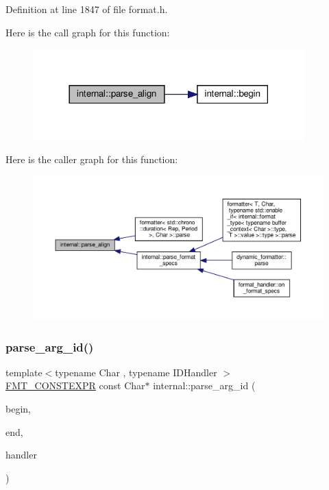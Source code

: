 Definition at line 1847 of file format.\+h.

Here is the call graph for this function\+:
\nopagebreak
\begin{figure}[H]
\begin{center}
\leavevmode
\includegraphics[width=297pt]{namespaceinternal_a07a6cecb40169f9f2eb091d0e83cc52f_cgraph}
\end{center}
\end{figure}
Here is the caller graph for this function\+:
\nopagebreak
\begin{figure}[H]
\begin{center}
\leavevmode
\includegraphics[width=350pt]{namespaceinternal_a07a6cecb40169f9f2eb091d0e83cc52f_icgraph}
\end{center}
\end{figure}
\mbox{\label{namespaceinternal_a0f424657f3b1900377b8597f5516432e}} 
\subsubsection{\texorpdfstring{parse\+\_\+arg\+\_\+id()}{parse\_arg\_id()}}
{\footnotesize\ttfamily template$<$typename Char , typename I\+D\+Handler $>$ \\
\hyperlink{core_8h_a69201cb276383873487bf68b4ef8b4cd}{F\+M\+T\+\_\+\+C\+O\+N\+S\+T\+E\+X\+PR} const Char$\ast$ internal\+::parse\+\_\+arg\+\_\+id (\begin{DoxyParamCaption}\item[{const Char $\ast$}]{begin,  }\item[{const Char $\ast$}]{end,  }\item[{I\+D\+Handler \&\&}]{handler }\end{DoxyParamCaption})}



